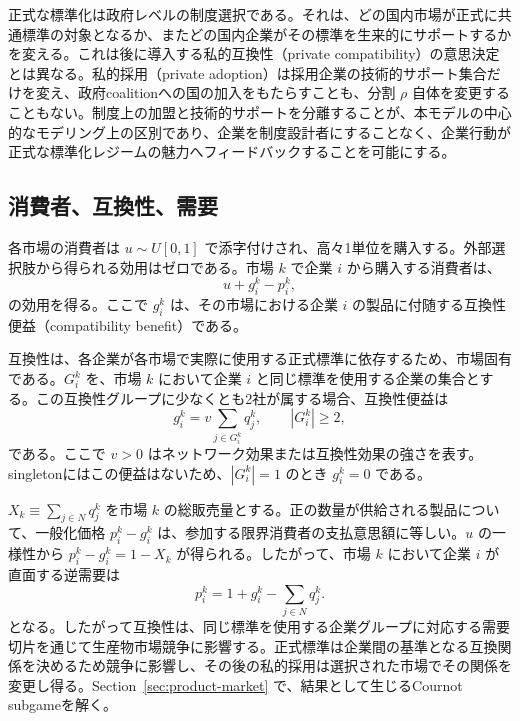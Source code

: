 正式な標準化は政府レベルの制度選択である。それは、どの国内市場が正式に共通標準の対象となるか、またどの国内企業がその標準を生来的にサポートするかを変える。これは後に導入する私的互換性（private compatibility）の意思決定とは異なる。私的採用（private adoption）は採用企業の技術的サポート集合だけを変え、政府coalitionへの国の加入をもたらすことも、分割 $\rho$ 自体を変更することもない。制度上の加盟と技術的サポートを分離することが、本モデルの中心的なモデリング上の区別であり、企業を制度設計者にすることなく、企業行動が正式な標準化レジームの魅力へフィードバックすることを可能にする。

\subsection{消費者、互換性、需要}
\label{subsec:model-demand}

各市場の消費者は $u\sim U[0,1]$ で添字付けされ、高々1単位を購入する。外部選択肢から得られる効用はゼロである。市場 $k$ で企業 $i$ から購入する消費者は、
\begin{equation}
    u+g_i^k-p_i^k,
    \label{eq:consumer-utility}
\end{equation}
の効用を得る。ここで $g_i^k$ は、その市場における企業 $i$ の製品に付随する互換性便益（compatibility benefit）である。

互換性は、各企業が各市場で実際に使用する正式標準に依存するため、市場固有である。$G_i^k$ を、市場 $k$ において企業 $i$ と同じ標準を使用する企業の集合とする。この互換性グループに少なくとも2社が属する場合、互換性便益は
\begin{equation}
    g_i^k
    =v\sum_{j\in G_i^k}q_j^k,
    \qquad |G_i^k|\ge 2,
    \label{eq:compatibility-benefit}
\end{equation}
である。ここで $v>0$ はネットワーク効果または互換性効果の強さを表す。singletonにはこの便益はないため、$|G_i^k|=1$ のとき $g_i^k=0$ である。

$X_k\equiv\sum_{j\in N}q_j^k$ を市場 $k$ の総販売量とする。正の数量が供給される製品について、一般化価格 $p_i^k-g_i^k$ は、参加する限界消費者の支払意思額に等しい。$u$ の一様性から $p_i^k-g_i^k=1-X_k$ が得られる。したがって、市場 $k$ において企業 $i$ が直面する逆需要は
\begin{equation}
    p_i^k
    =1+g_i^k-\sum_{j\in N}q_j^k.
    \label{eq:inverse-demand}
\end{equation}
となる。したがって互換性は、同じ標準を使用する企業グループに対応する需要切片を通じて生産物市場競争に影響する。正式標準は企業間の基準となる互換関係を決めるため競争に影響し、その後の私的採用は選択された市場でその関係を変更し得る。Section~\ref{sec:product-market} で、結果として生じるCournot subgameを解く。

